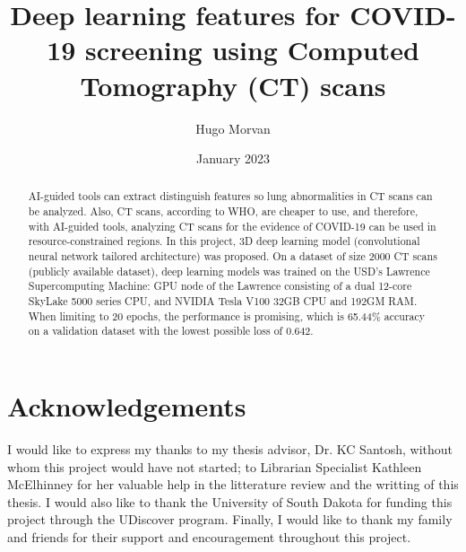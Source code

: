 \documentclass[12pt, letterpaper]{article}
\title{Deep learning features for COVID-19 screening using Computed Tomography (CT)
scans}
\author{Hugo Morvan}
\date{January 2023}
\begin{document}
\maketitle

\begin{abstract}
AI-guided tools can extract distinguish features so lung abnormalities in CT scans can be analyzed. Also, CT scans, according to WHO, are cheaper to use, and therefore, with AI-guided tools, analyzing CT scans for the evidence of COVID-19 can be used in resource-constrained regions. 
In this project, 3D deep learning model (convolutional neural network tailored architecture) was proposed. On a dataset of size 2000 CT scans (publicly available dataset), deep learning models was trained on the USD’s Lawrence Supercomputing Machine: GPU node of the Lawrence consisting of a dual 12-core SkyLake 5000 series CPU, and NVIDIA Tesla V100 32GB CPU and 192GM RAM. 
When limiting to 20 epochs, the performance is promising, which is 65.44\% accuracy on a validation dataset with the lowest possible loss of 0.642.




\end{abstract}

\newpage
\section{Acknowledgements}

I would like to express my thanks to my thesis advisor, Dr. KC Santosh, without whom this project would have not started; to Librarian Specialist Kathleen McElhinney for her valuable help in the litterature review and the writting of this thesis. I would also like to thank the University of South Dakota for funding this project through the UDiscover program. Finally, I would like to thank my family and friends for their support and encouragement throughout this project.

\newpage
\tableofcontents

\newpage
\listoffigures

\newpage
\end{document}
